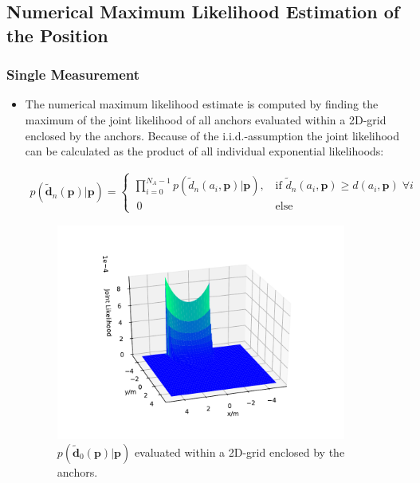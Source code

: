 \documentclass{article}
\begin{document}
\subsection{Numerical Maximum Likelihood Estimation of the Position}
\subsubsection{Single Measurement}

\begin{itemize}
\item The numerical maximum likelihood estimate is computed by finding the maximum of the joint likelihood of all anchors evaluated within a 2D-grid enclosed by the anchors. Because of the i.i.d.-assumption the joint likelihood can be calculated as the product of all individual exponential likelihoods:

\begin{align*}
p(\mathbf{\tilde{d}}_n(\mathbf{p})|\mathbf{p}) = 
\begin{cases}
\displaystyle \prod_{i=0}^{N_A-1} p(\tilde{d}_n(a_i,\mathbf{p})|\mathbf{p})\text{,}	& 	\; \text{if } \tilde{d}_n(a_i,\mathbf{p}) \geq d (a_i,\mathbf{p}) \; \forall i \\
\; 0 	&	\; \text{else}
\end{cases}
\end{align*} 

\begin{figure}[h]
\centering
\includegraphics[width=0.9\textwidth]{./Figures/scenario3_grid_nml.pdf}
\caption{$p(\mathbf{\tilde{d}}_0(\mathbf{p})|\mathbf{p})$ evaluated within a 2D-grid enclosed by the anchors.}
\label{fig:scenario3_grid_nml}
\end{figure}


\end{itemize}
\end{document}
